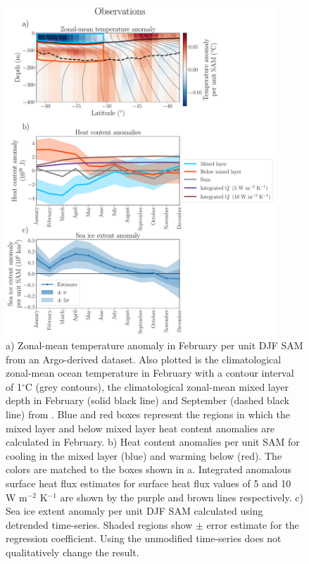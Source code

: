 \documentclass{ametsocV5}
\begin{document}
\begin{figure}[!ht]
    \begin{center}
        \includegraphics[width=0.9\textwidth]{figures/argo_regression_OHC_anomalies_and_time_series.pdf}
        \caption{a) Zonal-mean temperature anomaly in February per unit DJF SAM from an Argo-derived dataset. Also plotted is the climatological zonal-mean ocean temperature in February with a contour interval of 1$^{\circ}$C (grey contours), the climatological zonal-mean mixed layer depth in February (solid black line) and September (dashed black line) from \citet{Holte2017}. Blue and red boxes represent the regions in which the mixed layer and below mixed layer heat content anomalies are calculated in February.
        b) Heat content anomalies per unit SAM for cooling in the mixed layer (blue) and warming below (red). The colors are matched to the boxes shown in a. Integrated anomalous surface heat flux estimates for surface heat flux values of 5 and 10 W m$^{-2}$ K$^{-1}$ are shown by the purple and brown lines respectively.
        c) Sea ice extent anomaly per unit DJF SAM calculated using detrended time-series. Shaded regions show $\pm$ error estimate for the regression coefficient. Using the unmodified time-series does not qualitatively change the result.}
        \label{fig:argo_regression_OHC_anomalies_and_time_series}
    \end{center}
\end{figure}
\end{document}
